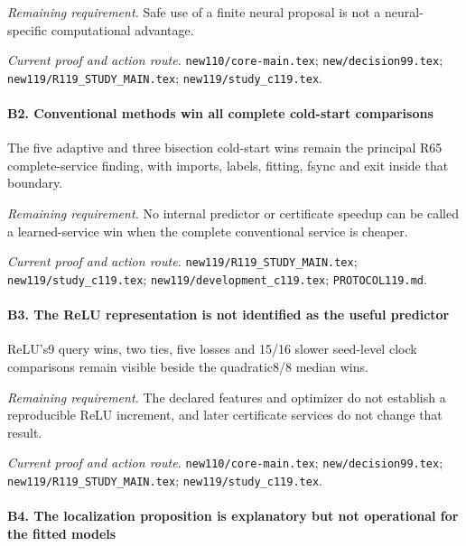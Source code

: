 \par\emph{Remaining requirement.} Safe use of a finite neural proposal is not a neural-specific computational advantage.

\par\emph{Current proof and action route.} \nolinkurl{new110/core-main.tex}; \nolinkurl{new/decision99.tex}; \nolinkurl{new119/R119_STUDY_MAIN.tex}; \nolinkurl{new119/study_c119.tex}.

\paragraph{B2. Conventional methods win all complete cold-start comparisons}

The five adaptive and three bisection cold-start wins remain the principal R65 complete-service finding, with imports, labels, fitting, fsync and exit inside that boundary.

\par\emph{Remaining requirement.} No internal predictor or certificate speedup can be called a learned-service win when the complete conventional service is cheaper.

\par\emph{Current proof and action route.} \nolinkurl{new119/R119_STUDY_MAIN.tex}; \nolinkurl{new119/study_c119.tex}; \nolinkurl{new119/development_c119.tex}; \nolinkurl{PROTOCOL119.md}.

\paragraph{B3. The ReLU representation is not identified as the useful predictor}

ReLU's9 query wins, two ties, five losses and 15/16 slower seed-level clock comparisons remain visible beside the quadratic8/8 median wins.

\par\emph{Remaining requirement.} The declared features and optimizer do not establish a reproducible ReLU increment, and later certificate services do not change that result.

\par\emph{Current proof and action route.} \nolinkurl{new110/core-main.tex}; \nolinkurl{new/decision99.tex}; \nolinkurl{new119/R119_STUDY_MAIN.tex}; \nolinkurl{new119/study_c119.tex}.

\paragraph{B4. The localization proposition is explanatory but not operational for the fitted models}

